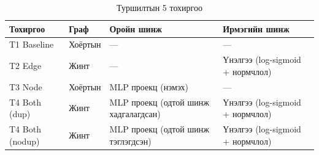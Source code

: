 \begin{table}[h]
\centering
\caption{Туршилтын 5 тохиргоо}
\label{tab:configs}
\begin{tabular}{llll}
\toprule
\textbf{Тохиргоо} & \textbf{Граф} & \textbf{Оройн шинж} & \textbf{Ирмэгийн шинж} \\
\midrule
T1 Baseline      & Хоёртын & ---                                   & ---                                       \\
T2 Edge          & Жинт   & ---                                   & Үнэлгээ (log-sigmoid + нормчлол)        \\
T3 Node          & Хоёртын & MLP проекц (нэмэх)                   & ---                                       \\
T4 Both (dup)    & Жинт   & MLP проекц (одтой шинж хадгалагдсан) & Үнэлгээ (log-sigmoid + нормчлол)        \\
T4 Both (nodup)  & Жинт   & MLP проекц (одтой шинж тэглэгдсэн)   & Үнэлгээ (log-sigmoid + нормчлол)        \\
\bottomrule
\end{tabular}
\end{table}
